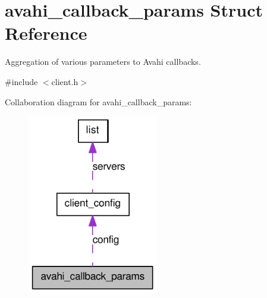 \hypertarget{structavahi__callback__params}{
\section{avahi\_\-callback\_\-params Struct Reference}
\label{structavahi__callback__params}
}


Aggregation of various parameters to Avahi callbacks.  




{\ttfamily \#include $<$client.h$>$}



Collaboration diagram for avahi\_\-callback\_\-params:\nopagebreak
\begin{figure}[H]
\begin{center}
\leavevmode
\includegraphics[width=162pt]{structavahi__callback__params__coll__graph}
\end{center}
\end{figure}
